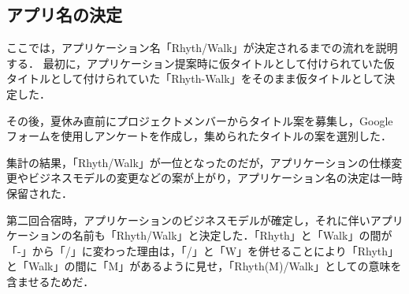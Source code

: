 \subsection{アプリ名の決定}
ここでは，アプリケーション名「Rhyth/Walk」が決定されるまでの流れを説明する．
最初に，アプリケーション提案時に仮タイトルとして付けられていた仮タイトルとして付けられていた「Rhyth-Walk」をそのまま仮タイトルとして決定した．\par
その後，夏休み直前にプロジェクトメンバーからタイトル案を募集し，Googleフォームを使用しアンケートを作成し，集められたタイトルの案を選別した．\par
集計の結果，「Rhyth/Walk」が一位となったのだが，アプリケーションの仕様変更やビジネスモデルの変更などの案が上がり，アプリケーション名の決定は一時保留された．\par
第二回合宿時，アプリケーションのビジネスモデルが確定し，それに伴いアプリケーションの名前も「Rhyth/Walk」と決定した．「Rhyth」と「Walk」の間が「-」から「/」に変わった理由は，「/」と「W」を併せることにより「Rhyth」と「Walk」の間に「M」があるように見せ，「Rhyth(M)/Walk」としての意味を含ませるためだ．\par
{}
